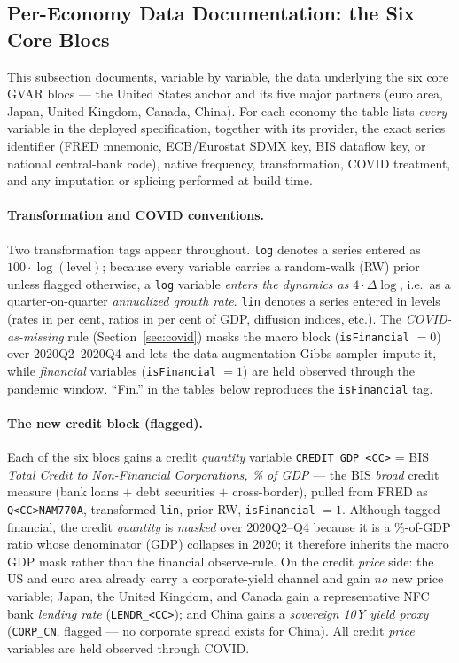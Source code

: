 \subsection{Per-Economy Data Documentation: the Six Core Blocs}\label{sec:percountry-data}

This subsection documents, variable by variable, the data underlying the
six core GVAR blocs --- the United States anchor and its five major
partners (euro area, Japan, United Kingdom, Canada, China). For each
economy the table lists \emph{every} variable in the deployed
specification, together with its provider, the exact series identifier
(FRED mnemonic, ECB/Eurostat SDMX key, BIS dataflow key, or national
central-bank code), native frequency, transformation, COVID treatment,
and any imputation or splicing performed at build time.

\paragraph{Transformation and COVID conventions.} Two transformation
tags appear throughout. \texttt{log} denotes a series entered as
$100\cdot\log(\text{level})$; because every variable carries a
random-walk (RW) prior unless flagged otherwise, a \texttt{log} variable
\emph{enters the dynamics as} $4\cdot\Delta\!\log$, i.e.\ as a
quarter-on-quarter \emph{annualized growth rate}. \texttt{lin} denotes a
series entered in levels (rates in per cent, ratios in per cent of GDP,
diffusion indices, etc.). The \emph{COVID-as-missing} rule
(Section~\ref{sec:covid}) masks the macro block (\texttt{isFinancial}
$=0$) over 2020Q2--2020Q4 and lets the data-augmentation Gibbs sampler
impute it, while \emph{financial} variables (\texttt{isFinancial} $=1$)
are held observed through the pandemic window. ``Fin.'' in the tables
below reproduces the \texttt{isFinancial} tag.

\paragraph{The new credit block (flagged).} Each of the six blocs gains a
credit \emph{quantity} variable
\texttt{CREDIT\_GDP\_<CC>} = BIS \emph{Total Credit to Non-Financial
Corporations, \% of GDP} --- the BIS \emph{broad} credit measure (bank
loans $+$ debt securities $+$ cross-border), pulled from FRED as
\texttt{Q<CC>NAM770A}, transformed \texttt{lin}, prior RW,
\texttt{isFinancial} $=1$. Although tagged financial, the credit
\emph{quantity} is \emph{masked} over 2020Q2--Q4 because it is a
\%-of-GDP ratio whose denominator (GDP) collapses in 2020; it therefore
inherits the macro GDP mask rather than the financial observe-rule. On
the credit \emph{price} side: the US and euro area already carry a
corporate-yield channel and gain \emph{no} new price variable; Japan,
the United Kingdom, and Canada gain a representative NFC bank
\emph{lending rate} (\texttt{LENDR\_<CC>}); and China gains a
\emph{sovereign 10Y yield proxy} (\texttt{CORP\_CN}, flagged --- no
corporate spread exists for China). All credit \emph{price} variables are
held observed through COVID.

